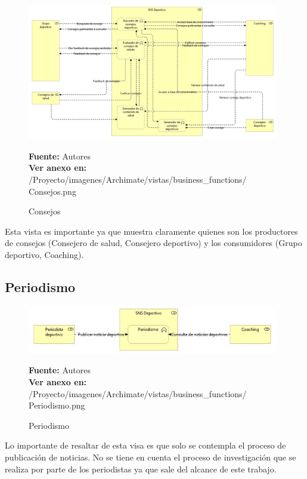 \begin{figure}[!htb]
  \begin{center}
    \includegraphics[width=11cm]{./imagenes/Archimate/vistas/business_functions/Consejos.png}
    \caption{Consejos}
    \label{fig:BF_Consejos}
    \textbf{Fuente:}  Autores \\
    \textbf{Ver anexo en:} /Proyecto/imagenes/Archimate/vistas/business\_functions/
    Consejos.png
  \end{center}
\end{figure}

Esta vista es importante ya que muestra claramente quienes son los productores de consejos (Consejero de salud, Consejero deportivo) y los consumidores (Grupo deportivo, Coaching).

\subsection{Periodismo}

\begin{figure}[!htb]
  \begin{center}
    \includegraphics[width=11cm]{./imagenes/Archimate/vistas/business_functions/Periodismo.png}
    \caption{Periodismo}
    \label{fig:BF_Periodismo}
    \textbf{Fuente:}  Autores
     \\
    \textbf{Ver anexo en:} /Proyecto/imagenes/Archimate/vistas/business\_functions/
    Periodismo.png
  \end{center}
\end{figure}

Lo importante de resaltar de esta visa es que solo se contempla el proceso de publicación de noticias. No se tiene en cuenta el proceso de investigación que se realiza por parte de los periodistas ya que sale del alcance de este trabajo. 


